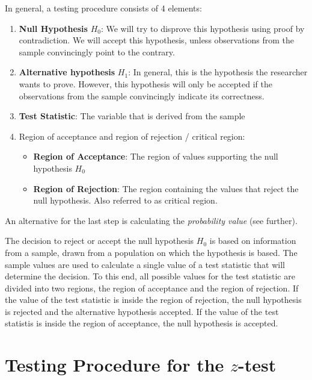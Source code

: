 In general, a testing procedure consists of 4 elements:
\begin{enumerate}
  \item \textbf{Null Hypothesis} $H_{0}$: We will try to disprove this hypothesis using proof by contradiction. We will accept this hypothesis, unless observations from the sample convincingly point to the contrary.
  \item \textbf{Alternative hypothesis} $H_{1}$: In general, this is the hypothesis the researcher wants to prove. However, this hypothesis will only be accepted if the observations from the sample convincingly indicate its correctness.
  \item \textbf{Test Statistic}: The variable that is derived from the sample
  \item Region of acceptance and region of rejection / critical region:
  \begin{itemize}
    \item \textbf{Region of Acceptance}: The region of values supporting the null hypothesis $H_{0}$
    \item \textbf{Region of Rejection}: The region containing the values that reject the null hypothesis. Also referred to as critical region.
  \end{itemize}
\end{enumerate}

An alternative for the last step is calculating the \emph{probability value} (see further).

The decision to reject or accept the null hypothesis $H_{0}$ is based on information from a sample, drawn from a population on which the hypothesis is based.
The sample values are used to calculate a single value of a test statistic that will determine the decision. 
To this end, all possible values for the test statistic are divided into two regions, the region of acceptance and the region of rejection.
If the value of the test statistic is inside the region of rejection, the null hypothesis is rejected and the alternative hypothesis accepted.
If the value of the test statistis is inside the region of acceptance, the null hypothesis is accepted.

\section{Testing Procedure for the \texorpdfstring{$z$}{z}-test}
\label{sec:testing-procedure-z-test}

